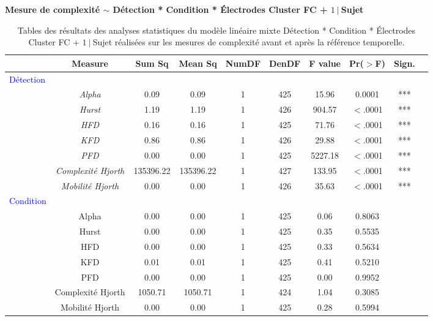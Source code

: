 \begin{table}[!t]
\centering
\scriptsize
\caption[Table des résultats des analyses statistiques pour les mesures de complexité des électrodes du cluster FC]{Tables des résultats des analyses statistiques du modèle linéaire mixte Détection * Condition * Électrodes Cluster FC + $1~|~$Sujet réalisées sur les mesures de complexité avant et après la référence temporelle.}
\label{tab:table5statsmesurescomplexiteelectrode}

\textbf{Mesure de complexité $\sim$  Détection * Condition * Électrodes Cluster FC + $1~|~$Sujet}

\begin{tabular}{|l|*{9}{c|}}
\hline
& \textbf{Measure} & \textbf{Sum Sq} & \textbf{Mean Sq} & \textbf{NumDF} & \textbf{DenDF} & \textbf{F value} & \textbf{Pr($>$F)} & \textbf{Sign.} \\ 
\hline
\textcolor{blue}{Détection} & & & & & & & & \\ 
\hline
& \textit{Alpha} & 0.09 & 0.09 & 1 & 425 & 15.96 & 0.0001 & *** \\ 
& \textit{Hurst} & 1.19 & 1.19 & 1 & 426 & 904.57 & $<$.0001 & *** \\ 
& \textit{HFD} & 0.16 & 0.16 & 1 & 425 & 71.76 & $<$.0001 & *** \\ 
& \textit{KFD} & 0.86 & 0.86 & 1 & 426 & 29.88 & $<$.0001 & *** \\ 
& \textit{PFD} & 0.00 & 0.00 & 1 & 425 & 5227.18 & $<$.0001 & *** \\ 
& \textit{Complexité Hjorth} & 135396.22 & 135396.22 & 1 & 427 & 133.95 & $<$.0001 & *** \\ 
& \textit{Mobilité Hjorth} & 0.00 & 0.00 & 1 & 426 & 35.63 & $<$.0001 & *** \\ 
\hline
\textcolor{blue}{Condition} & & & & & & & & \\ 
\hline
& Alpha & 0.00 & 0.00 & 1 & 425 & 0.06 & 0.8063 & \\ 
& Hurst & 0.00 & 0.00 & 1 & 425 & 0.35 & 0.5535 & \\ 
& HFD & 0.00 & 0.00 & 1 & 425 & 0.33 & 0.5634 & \\ 
& KFD & 0.01 & 0.01 & 1 & 425 & 0.41 & 0.5210 & \\ 
& PFD & 0.00 & 0.00 & 1 & 425 & 0.00 & 0.9952 & \\ 
& Complexité Hjorth & 1050.71 & 1050.71 & 1 & 424 & 1.04 & 0.3085 & \\ 
& Mobilité Hjorth & 0.00 & 0.00 & 1 & 425 & 0.28 & 0.5994 & \\ 

\end{tabular}
\end{table}
